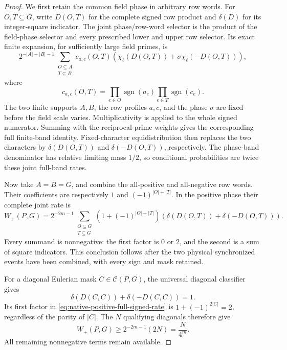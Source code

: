 \documentclass[11pt]{article}
\newcommand{\T}{\mathbf T}
\begin{document}
\begin{proof}
We first retain the common field phase in arbitrary row words.
For \(O,T\subseteq G\), write \(D(O,T)\) for the complete signed row
product and \(\delta(D)\) for its integer-square indicator.
The joint phase/row-word selector is the product of the field-phase
selector and every prescribed lower and upper row selector.
Its exact finite expansion, for sufficiently large field primes, is
\[
 2^{-|A|-|B|-1}
 \sum_{\substack{O\subseteq A\\T\subseteq B}}
  c_{a,c}(O,T)
   \left(\chi_\ell(D(O,T))
                 +\sigma\chi_\ell(-D(O,T))\right),
\]
where
\[
 c_{a,c}(O,T)=
    \prod_{e\in O}\operatorname{sgn}(a_e)
    \prod_{e\in T}\operatorname{sgn}(c_e).
\]
The two finite supports \(A,B\), the row profiles \(a,c\), and
the phase \(\sigma\) are fixed before the field scale varies.
Multiplicativity is applied to the whole signed numerator.
Summing with the reciprocal-prime weights gives the corresponding
full finite-band identity. Fixed-character equidistribution then
replaces the two characters by
\(\delta(D(O,T))\) and \(\delta(-D(O,T))\), respectively.
The phase-band denominator has relative limiting mass \(1/2\),
so conditional probabilities are twice these joint full-band rates.

Now take \(A=B=G\), and combine the all-positive and all-negative
row words. Their coefficients are respectively \(1\) and
\((-1)^{|O|+|T|}\). In the positive phase their complete joint rate is
\begin{equation}\label{eq:native-positive-full-signed-rate}
 W_+(P,G)=
 2^{-2m-1}\sum_{\substack{O\subseteq G\\T\subseteq G}}
 \left(1+(-1)^{|O|+|T|}\right)
 \left(\delta(D(O,T))+\delta(-D(O,T))\right).
\end{equation}
Every summand is nonnegative: the first factor is \(0\) or \(2\),
and the second is a sum of square indicators.
This conclusion follows after the two physical synchronized events
have been combined, with every sign and mask retained.

For a diagonal Eulerian mask \(C\in\mathcal C(P,G)\), the universal
diagonal classifier gives
\[
             \delta(D(C,C))+\delta(-D(C,C))=1.
\]
Its first factor in \eqref{eq:native-positive-full-signed-rate}
is \(1+(-1)^{2|C|}=2\), regardless of the parity of \(|C|\).
The \(N\) qualifying diagonals therefore give
\[
                  W_+(P,G)\geq 2^{-2m-1}(2N)=\frac{N}{4^m}.
\]
All remaining nonnegative terms remain available.


\end{proof}
\end{document}
